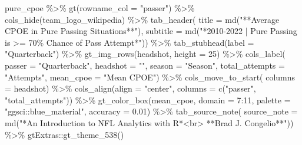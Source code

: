 \documentclass[
  letterpaper,
]{krantz}
\newenvironment{Shaded}{\begin{snugshade}}{\end{snugshade}}
\newcommand{\AttributeTok}[1]{\textcolor[rgb]{0.40,0.45,0.13}{#1}}
\newcommand{\DecValTok}[1]{\textcolor[rgb]{0.68,0.00,0.00}{#1}}
\newcommand{\FloatTok}[1]{\textcolor[rgb]{0.68,0.00,0.00}{#1}}
\newcommand{\FunctionTok}[1]{\textcolor[rgb]{0.28,0.35,0.67}{#1}}
\newcommand{\NormalTok}[1]{\textcolor[rgb]{0.00,0.23,0.31}{#1}}
\newcommand{\SpecialCharTok}[1]{\textcolor[rgb]{0.37,0.37,0.37}{#1}}
\newcommand{\StringTok}[1]{\textcolor[rgb]{0.13,0.47,0.30}{#1}}
\begin{document}
\begin{Shaded}
\begin{Highlighting}[]
\NormalTok{pure\_cpoe }\SpecialCharTok{\%\textgreater{}\%}
  \FunctionTok{gt}\NormalTok{(}\AttributeTok{rowname\_col =} \StringTok{"passer"}\NormalTok{) }\SpecialCharTok{\%\textgreater{}\%}
  \FunctionTok{cols\_hide}\NormalTok{(team\_logo\_wikipedia) }\SpecialCharTok{\%\textgreater{}\%}
  \FunctionTok{tab\_header}\NormalTok{(}
    \AttributeTok{title =} \FunctionTok{md}\NormalTok{(}\StringTok{"**Average CPOE in Pure Passing Situations**"}\NormalTok{),}
    \AttributeTok{subtitle =} \FunctionTok{md}\NormalTok{(}\StringTok{"*2010{-}2022  |  Pure Passing is \textgreater{}= 70\% Chance of Pass Attempt*"}\NormalTok{)) }\SpecialCharTok{\%\textgreater{}\%}
  \FunctionTok{tab\_stubhead}\NormalTok{(}\AttributeTok{label =} \StringTok{"Quarterback"}\NormalTok{) }\SpecialCharTok{\%\textgreater{}\%}
  \FunctionTok{gt\_img\_rows}\NormalTok{(headshot, }\AttributeTok{height =} \DecValTok{25}\NormalTok{) }\SpecialCharTok{\%\textgreater{}\%}
  \FunctionTok{cols\_label}\NormalTok{(}
    \AttributeTok{passer =} \StringTok{"Quarterback"}\NormalTok{,}
    \AttributeTok{headshot =} \StringTok{""}\NormalTok{,}
    \AttributeTok{season =} \StringTok{"Season"}\NormalTok{,}
    \AttributeTok{total\_attempts =} \StringTok{"Attempts"}\NormalTok{,}
    \AttributeTok{mean\_cpoe =} \StringTok{"Mean CPOE"}\NormalTok{) }\SpecialCharTok{\%\textgreater{}\%}
  \FunctionTok{cols\_move\_to\_start}\NormalTok{(}
    \AttributeTok{columns =}\NormalTok{ headshot) }\SpecialCharTok{\%\textgreater{}\%}
  \FunctionTok{cols\_align}\NormalTok{(}\AttributeTok{align =} \StringTok{"center"}\NormalTok{, }\AttributeTok{columns =} \FunctionTok{c}\NormalTok{(}\StringTok{"passer"}\NormalTok{, }\StringTok{"total\_attempts"}\NormalTok{)) }\SpecialCharTok{\%\textgreater{}\%}
  \FunctionTok{gt\_color\_box}\NormalTok{(mean\_cpoe, }\AttributeTok{domain =} \DecValTok{7}\SpecialCharTok{:}\DecValTok{11}\NormalTok{,}
               \AttributeTok{palette =} \StringTok{"ggsci::blue\_material"}\NormalTok{, }\AttributeTok{accuracy =} \FloatTok{0.01}\NormalTok{) }\SpecialCharTok{\%\textgreater{}\%}
  \FunctionTok{tab\_source\_note}\NormalTok{(}
    \AttributeTok{source\_note =} \FunctionTok{md}\NormalTok{(}\StringTok{"*An Introduction to NFL Analytics with R*\textless{}br\textgreater{}}
\StringTok{                     **Brad J. Congelio**"}\NormalTok{)) }\SpecialCharTok{\%\textgreater{}\%}
\NormalTok{  gtExtras}\SpecialCharTok{::}\FunctionTok{gt\_theme\_538}\NormalTok{()}
\end{Highlighting}
\end{Shaded}
\end{document}
